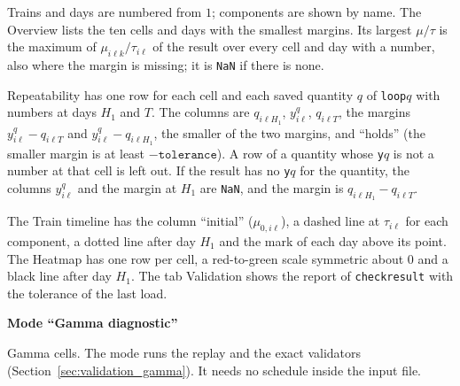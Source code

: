 \documentclass[11pt,a4paper]{article}
\theoremstyle{plain}
\theoremstyle{definition}
\newcommand{\blockhead}[1]{\par\noindent\textbf{#1}\par\nobreak}
\renewcommand{\_}{\textunderscore\allowbreak{}}
\begin{document}
Trains and days are numbered from $1$; components are shown by name. The Overview lists the ten cells and days with the smallest margins. Its largest $\mu/\tau$ is the maximum of $\mu_{i\ell k}/\tau_{i\ell}$ of the result over every cell and day with a number, also where the margin is missing; it is \texttt{NaN} if there is none.

Repeatability has one row for each cell and each saved quantity $q$ of \texttt{loop\_}$q$ with numbers at days $H_1$ and $T$. The columns are $q_{i\ell H_1}$, $y^q_{i\ell}$, $q_{i\ell T}$, the margins $y^q_{i\ell}-q_{i\ell T}$ and $y^q_{i\ell}-q_{i\ell H_1}$, the smaller of the two margins, and ``holds'' (the smaller margin is at least $-\texttt{tolerance}$). A row of a quantity whose \texttt{y\_}$q$ is not a number at that cell is left out. If the result has no \texttt{y\_}$q$ for the quantity, the columns $y^q_{i\ell}$ and the margin at $H_1$ are \texttt{NaN}, and the margin is $q_{i\ell H_1}-q_{i\ell T}$.

The Train timeline has the column ``initial'' ($\mu_{0,i\ell}$), a dashed line at $\tau_{i\ell}$ for each component, a dotted line after day $H_1$ and the mark of each day above its point. The Heatmap has one row per cell, a red-to-green scale symmetric about $0$ and a black line after day $H_1$. The tab Validation shows the report of \texttt{check\_result} with the tolerance of the last load.

\blockhead{Mode ``Gamma diagnostic''}
Gamma cells. The mode runs the replay and the exact validators (Section~\ref{sec:validation_gamma}). It needs no schedule inside the input file.
\end{document}
